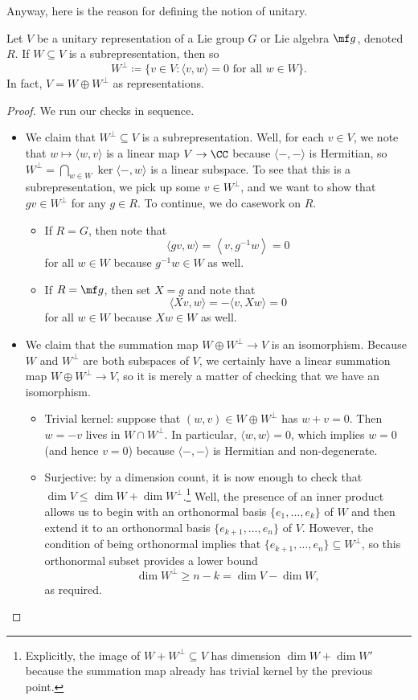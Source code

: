 \documentclass[../notes.tex]{subfiles}
\begin{document}
Anyway, here is the reason for defining the notion of unitary.
\begin{proposition} \label{prop:unitary-complement}
	Let $V$ be a unitary representation of a Lie group $G$ or Lie algebra $\mf g$, denoted $R$. If $W\subseteq V$ is a subrepresentation, then so
	\[W^\perp\coloneqq\{v\in V:\langle v,w\rangle=0\text{ for all }w\in W\}.\]
	In fact, $V=W\oplus W^\perp$ as representations.
\end{proposition}
\begin{proof}
	We run our checks in sequence.
	\begin{itemize}
		\item We claim that $W^\perp\subseteq V$ is a subrepresentation. Well, for each $v\in V$, we note that $w\mapsto\langle w,v\rangle$ is a linear map $V\to\CC$ because $\langle-,-\rangle$ is Hermitian, so $W^\perp=\bigcap_{w\in W}\ker\langle-,w\rangle$ is a linear subspace. To see that this is a subrepresentation, we pick up some $v\in W^\perp$, and we want to show that $gv\in W^\perp$ for any $g\in R$. To continue, we do casework on $R$.
		\begin{itemize}
			\item If $R=G$, then note that
			\[\langle gv,w\rangle=\left\langle v,g^{-1}w\right\rangle=0\]
			for all $w\in W$ because $g^{-1}w\in W$ as well.
			\item If $R=\mf g$, then set $X=g$ and note that
			\[\langle Xv,w\rangle=-\langle v,Xw\rangle=0\]
			for all $w\in W$ because $Xw\in W$ as well.
		\end{itemize}

		\item We claim that the summation map $W\oplus W^\perp\to V$ is an isomorphism. Because $W$ and $W^\perp$ are both subspaces of $V$, we certainly have a linear summation map $W\oplus W^\perp\to V$, so it is merely a matter of checking that we have an isomorphism.
		\begin{itemize}
			\item Trivial kernel: suppose that $(w,v)\in W\oplus W^\perp$ has $w+v=0$. Then $w=-v$ lives in $W\cap W^\perp$. In particular, $\langle w,w\rangle=0$, which implies $w=0$ (and hence $v=0$) because $\langle-,-\rangle$ is Hermitian and non-degenerate.
			\item Surjective: by a dimension count, it is now enough to check that $\dim V\le\dim W+\dim W^\perp$.\footnote{Explicitly, the image of $W+W^\perp\subseteq V$ has dimension $\dim W+\dim W'$ because the summation map already has trivial kernel by the previous point.} Well, the presence of an inner product allows us to begin with an orthonormal basis $\{e_1,\ldots,e_k\}$ of $W$ and then extend it to an orthonormal basis $\{e_{k+1},\ldots,e_n\}$ of $V$. However, the condition of being orthonormal implies that $\{e_{k+1},\ldots,e_n\}\subseteq W^\perp$, so this orthonormal subset provides a lower bound
			\[\dim W^\perp\ge n-k=\dim V-\dim W,\]
			as required.
			\qedhere
		\end{itemize}
	\end{itemize}
\end{proof}
\end{document}
